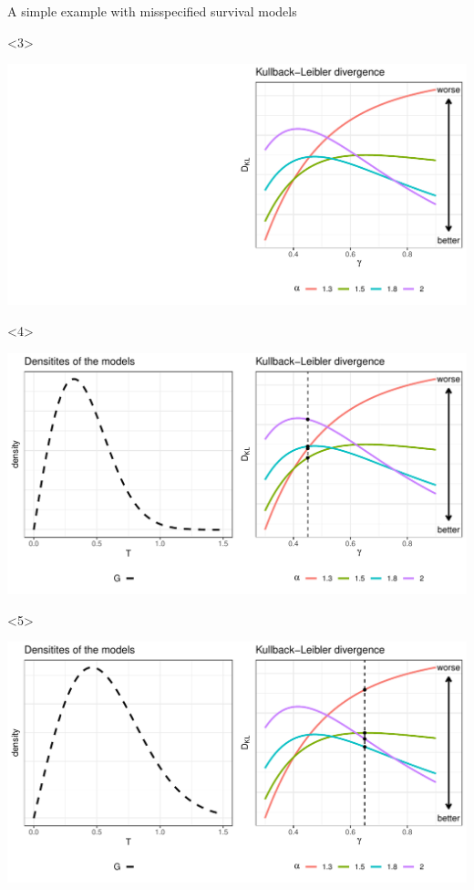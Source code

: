 \documentclass[smaller]{beamer}\usepackage{listings}
\begin{document}
\begin{frame}[label={sec:org0d529a0}]{A simple example with misspecified survival models}
\begin{onlyenv}<3>
\begin{center}
\includegraphics[width=.9\linewidth]{fig-mix-const-v3.pdf}
\end{center}
\end{onlyenv}


\begin{onlyenv}<4>
\begin{center}
\includegraphics[width=.9\linewidth]{fig-mix-const-v4.pdf}
\end{center}
\end{onlyenv}

\begin{onlyenv}<5>
\begin{center}
\includegraphics[width=.9\linewidth]{fig-mix-const-v5.pdf}
\end{center}
\end{onlyenv}
\end{frame}
\end{document}
